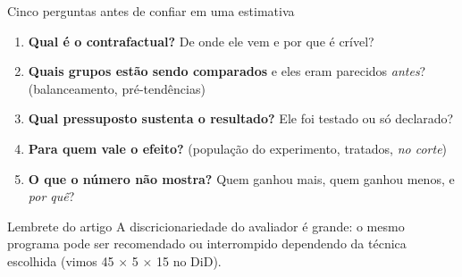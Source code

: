 \begin{frame}{Cinco perguntas antes de confiar em uma estimativa}
  \begin{enumerate}
    \item \textbf{Qual é o contrafactual?} De onde ele vem e por que é crível?
    \item \textbf{Quais grupos estão sendo comparados} e eles eram parecidos \emph{antes}? (balanceamento, pré-tendências)
    \item \textbf{Qual pressuposto sustenta o resultado?} Ele foi testado ou só declarado?
    \item \textbf{Para quem vale o efeito?} (população do experimento, tratados, \emph{no corte})
    \item \textbf{O que o número não mostra?} Quem ganhou mais, quem ganhou menos, e \emph{por quê}?
  \end{enumerate}
  \vspace{0.3cm}
  \begin{block}{Lembrete do artigo}
    \small A discricionariedade do avaliador é grande: o mesmo programa pode ser recomendado ou interrompido dependendo da técnica escolhida (vimos 45 $\times$ 5 $\times$ 15 no DiD).
  \end{block}
\end{frame}

